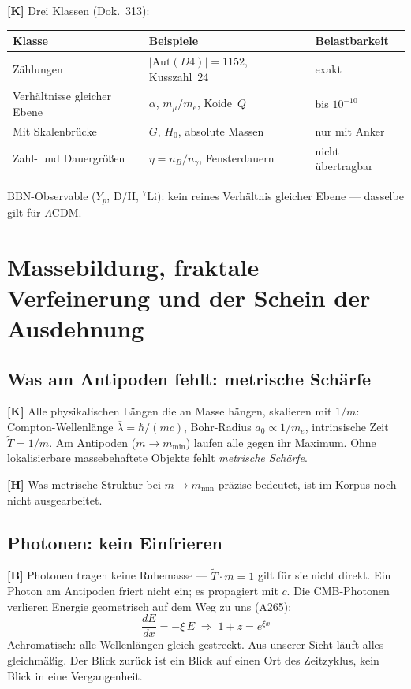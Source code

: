 \textbf{[K]} Drei Klassen (Dok.~313):

\begin{center}
\small
\begin{tabular}{p{3.2cm}p{4cm}p{3cm}}
\toprule
Klasse & Beispiele & Belastbarkeit \\
\midrule
Zählungen & $|\text{Aut}(D4)| = 1152$, Kusszahl~24 & exakt \\
Verhältnisse gleicher Ebene & $\alpha$, $m_\mu/m_e$, Koide~$Q$ &
  bis $10^{-10}$ \\
Mit Skalenbrücke & $G$, $H_0$, absolute Massen & nur mit Anker \\
Zahl- und Dauergrößen & $\eta = n_B/n_\gamma$, Fensterdauern &
  nicht übertragbar \\
\bottomrule
\end{tabular}
\end{center}

BBN-Observable ($Y_p$, D/H, ${}^7$Li): kein reines Verhältnis
gleicher Ebene --- dasselbe gilt für $\Lambda$CDM.

\section{Massebildung, fraktale Verfeinerung und der Schein der Ausdehnung}

\subsection{Was am Antipoden fehlt: metrische Schärfe}

\textbf{[K]} Alle physikalischen Längen die an Masse hängen, skalieren
mit $1/m$: Compton-Wellenlänge $\bar\lambda = \hbar/(mc)$,
Bohr-Radius $a_0 \propto 1/m_e$, intrinsische Zeit $\tilde{T} = 1/m$.
Am Antipoden ($m \to m_\text{min}$) laufen alle gegen ihr Maximum.
Ohne lokalisierbare massebehaftete Objekte fehlt \emph{metrische Schärfe}.

\textbf{[H]} Was metrische Struktur bei $m \to m_\text{min}$ präzise
bedeutet, ist im Korpus noch nicht ausgearbeitet.

\subsection{Photonen: kein Einfrieren}

\textbf{[B]} Photonen tragen keine Ruhemasse --- $\tilde{T} \cdot m = 1$
gilt für sie nicht direkt. Ein Photon am Antipoden friert nicht ein;
es propagiert mit $c$. Die CMB-Photonen verlieren Energie geometrisch
auf dem Weg zu uns (A265):
\[
  \frac{dE}{dx} = -\xi\,E
  \;\Rightarrow\;
  1 + z = e^{\xi x}
\]
Achromatisch: alle Wellenlängen gleich gestreckt.
Aus unserer Sicht läuft alles gleichmäßig. Der Blick zurück ist ein
Blick auf einen Ort des Zeitzyklus, kein Blick in eine Vergangenheit.


